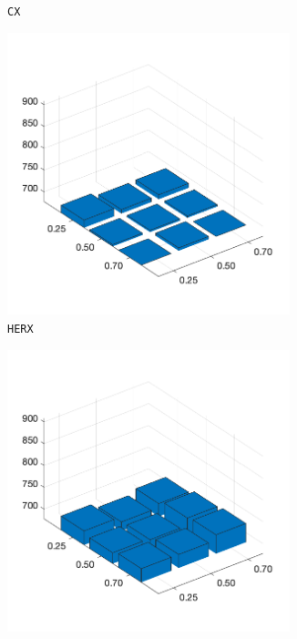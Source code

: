 \begin{figure}[H]
\begin{subfigure}[b]{0.25\textwidth}
		\caption{\texttt{CX}}
		\label{fig:x}
    	\end{subfigure}
%
	\begin{subfigure}[b]{0.25\textwidth}
		\centering
		\includegraphics[width=0.9\textwidth]{crossover/min/cross_edge_heuristic_1.png}
		\caption{\texttt{HERX}}
		\label{fig:y}
    	\end{subfigure}
%
	\begin{subfigure}[b]{0.25\textwidth}
		\centering
		\includegraphics[width=0.9\textwidth]{crossover/min/cross_edge_recombination_1.png}

\end{subfigure}
\end{figure}
